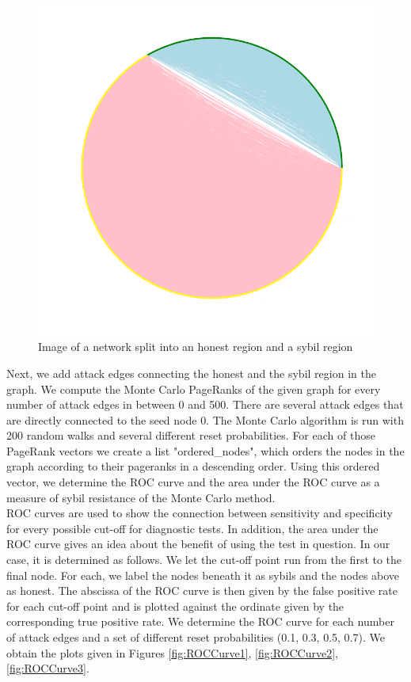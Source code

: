 \documentclass[sigconf]{acmart}
\theoremstyle{definition}
\begin{document}
\begin{figure}
\includegraphics[scale=0.3]{SybilRegion}
\caption{Image of a network split into an honest region and a sybil region}
\label{fig:Accuracy2}
\end{figure}

Next, we add attack edges connecting the honest and the sybil region in the graph. We compute the Monte Carlo PageRanks of the given graph for every number of attack edges in between 0 and 500. There are several attack edges that are directly connected to the seed node 0. The Monte Carlo algorithm is run with 200 random walks and several different reset probabilities. For each of those PageRank vectors we create a list "ordered\_{}nodes", which orders the nodes in the graph according to their pageranks in a descending order. Using this ordered vector, we determine the ROC curve and the area under the ROC curve as a measure of sybil resistance of the Monte Carlo method. \vspace{1em}\\

\noindent ROC curves are used to show the connection between sensitivity and specificity for every possible cut-off for diagnostic tests. In addition, the area under the ROC curve gives an idea about the benefit of using the test in question. In our case, it is determined as follows. We let the cut-off point run from the first to the final node. For each, we label the nodes beneath it as sybils and the nodes above as honest. The abscissa of the ROC curve is then given by the false positive rate for each cut-off point and is plotted against the ordinate given by the corresponding true positive rate. We determine the ROC curve for each number of attack edges and a set of different reset probabilities (0.1, 0.3, 0.5, 0.7). We obtain the plots given in Figures \ref{fig:ROCCurve1}, \ref{fig:ROCCurve2}, \ref{fig:ROCCurve3}.\vspace{1em}\\
\end{document}

